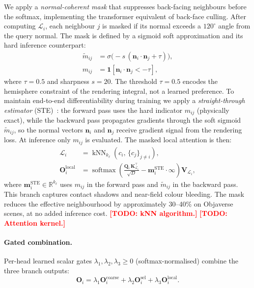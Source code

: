 \documentclass{egpubl}
\newcommand{\todo}[1]{\textcolor{red}{\textbf{[TODO: #1]}}}
\begin{document}
We apply a \emph{normal-coherent mask} that suppresses back-facing
neighbours before the softmax, implementing the transformer equivalent
of back-face culling.
After computing $\mathcal{L}_i$, each neighbour $j$ is masked if its
normal exceeds a $120^\circ$ angle from the query normal.
The mask is defined by a sigmoid soft approximation and its hard
inference counterpart:
\begin{align}
  \tilde{m}_{ij} &= \sigma\!\bigl(-s\,(\mathbf{n}_i \cdot \mathbf{n}_j + \tau)\bigr),
  \label{eq:ncmask_soft} \\
  m_{ij}         &= \mathbf{1}[\mathbf{n}_i \cdot \mathbf{n}_j < -\tau],
  \label{eq:ncmask_hard}
\end{align}
where $\tau = 0.5$ and sharpness $s = 20$.
The threshold $\tau = 0.5$ encodes the hemisphere constraint of the
rendering integral, not a learned preference.
To maintain end-to-end differentiability during training we apply a
\emph{straight-through estimator} (STE)~\cite{bengio2013estimating}: the
forward pass uses the hard indicator $m_{ij}$ (physically exact), while
the backward pass propagates gradients through the soft sigmoid
$\tilde{m}_{ij}$, so the normal vectors $\mathbf{n}_i$ and $\mathbf{n}_j$
receive gradient signal from the rendering loss.
At inference only $m_{ij}$ is evaluated.
The masked local attention is then:
\begin{align}
  \mathcal{L}_i &= \operatorname{kNN}_{k_\ell}\!(c_i,\, \{c_j\}_{j \neq i}),
  \label{eq:knn} \\
  \mathbf{O}_i^\text{local} &=
    \operatorname{softmax}\!\!\left(
      \frac{\mathbf{Q}_i\,\mathbf{K}_{\mathcal{L}_i}^\top}{\sqrt{D}}
      - \mathbf{m}_i^{\mathrm{STE}} \cdot \infty
    \right)
    \mathbf{V}_{\mathcal{L}_i},
  \label{eq:local_masked}
\end{align}
where $\mathbf{m}_i^{\mathrm{STE}} \in \mathbb{R}^{k_\ell}$ uses $m_{ij}$
in the forward pass and $\tilde{m}_{ij}$ in the backward pass.
This branch captures contact shadows and near-field colour bleeding.
The mask reduces the effective neighbourhood by approximately 30--40\%
on Objaverse scenes, at no added inference cost.
\todo{kNN algorithm.}
\todo{Attention kernel.}

\paragraph{Gated combination.}
Per-head learned scalar gates $\lambda_1, \lambda_2, \lambda_3 \geq 0$
(softmax-normalised) combine the three branch outputs:
\begin{equation}
  \mathbf{O}_i =
    \lambda_1 \mathbf{O}_i^\text{coarse}
    + \lambda_2 \mathbf{O}_i^\text{sel}
    + \lambda_3 \mathbf{O}_i^\text{local}.
  \label{eq:gate}
\end{equation}
\end{document}
